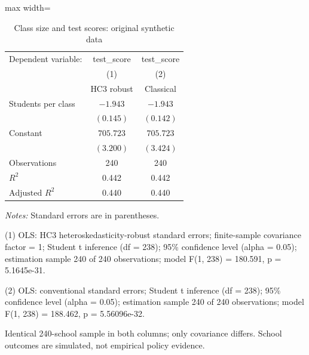 \begin{table}[htbp]
\centering
\caption{Class size and test scores: original synthetic data}
\label{tab:lab04-class-size}
\begingroup
\small
\setlength{\tabcolsep}{6pt}
\renewcommand{\arraystretch}{1.12}
\begin{adjustbox}{max width=\linewidth}
\begin{tabular}{@{}lcc@{}}
\toprule
Dependent variable: & test\_score & test\_score \\
 & (1) & (2) \\
 & HC3 robust & Classical \\
\midrule
Students per class & $-1.943$ & $-1.943$ \\
 & $(0.145)$ & $(0.142)$ \\[0.35em]
Constant & $705.723$ & $705.723$ \\
 & $(3.200)$ & $(3.424)$ \\[0.35em]
\midrule
Observations & 240 & 240 \\
$R^{2}$ & 0.442 & 0.442 \\
$\text{Adjusted }R^{2}$ & 0.440 & 0.440 \\
\bottomrule
\end{tabular}
\end{adjustbox}
\par\smallskip
\begin{minipage}{\linewidth}
\footnotesize
\raggedright
\textit{Notes:} Standard errors are in parentheses.\par
(1) OLS: HC3 heteroskedasticity-robust standard errors; finite-sample covariance factor = 1; Student t inference (df = 238); 95\% confidence level (alpha = 0.05); estimation sample 240 of 240 observations; model F(1, 238) = 180.591, p = 5.1645e-31.\par
(2) OLS: conventional standard errors; Student t inference (df = 238); 95\% confidence level (alpha = 0.05); estimation sample 240 of 240 observations; model F(1, 238) = 188.462, p = 5.56096e-32.\par
Identical 240-school sample in both columns; only covariance differs. School outcomes are simulated, not empirical policy evidence.\par
\end{minipage}
\endgroup
\end{table}